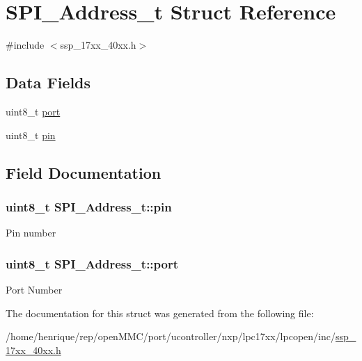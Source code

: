 \hypertarget{structSPI__Address__t}{\section{S\-P\-I\-\_\-\-Address\-\_\-t Struct Reference}
\label{structSPI__Address__t}
}


{\ttfamily \#include $<$ssp\-\_\-17xx\-\_\-40xx.\-h$>$}

\subsection*{Data Fields}
\begin{DoxyCompactItemize}
\item 
uint8\-\_\-t \hyperlink{structSPI__Address__t_a64ccbaf37a32da0f13b46325b4b42c4d}{port}
\item 
uint8\-\_\-t \hyperlink{structSPI__Address__t_aa89aa381abb683131e6d7b3158b25155}{pin}
\end{DoxyCompactItemize}


\subsection{Field Documentation}
\hypertarget{structSPI__Address__t_aa89aa381abb683131e6d7b3158b25155}{
\subsubsection[{pin}]{\setlength{\rightskip}{0pt plus 5cm}uint8\-\_\-t S\-P\-I\-\_\-\-Address\-\_\-t\-::pin}}\label{structSPI__Address__t_aa89aa381abb683131e6d7b3158b25155}
Pin number \hypertarget{structSPI__Address__t_a64ccbaf37a32da0f13b46325b4b42c4d}{
\subsubsection[{port}]{\setlength{\rightskip}{0pt plus 5cm}uint8\-\_\-t S\-P\-I\-\_\-\-Address\-\_\-t\-::port}}\label{structSPI__Address__t_a64ccbaf37a32da0f13b46325b4b42c4d}
Port Number 

The documentation for this struct was generated from the following file\-:\begin{DoxyCompactItemize}
\item 
/home/henrique/rep/open\-M\-M\-C/port/ucontroller/nxp/lpc17xx/lpcopen/inc/\hyperlink{ssp__17xx__40xx_8h}{ssp\-\_\-17xx\-\_\-40xx.\-h}\end{DoxyCompactItemize}
